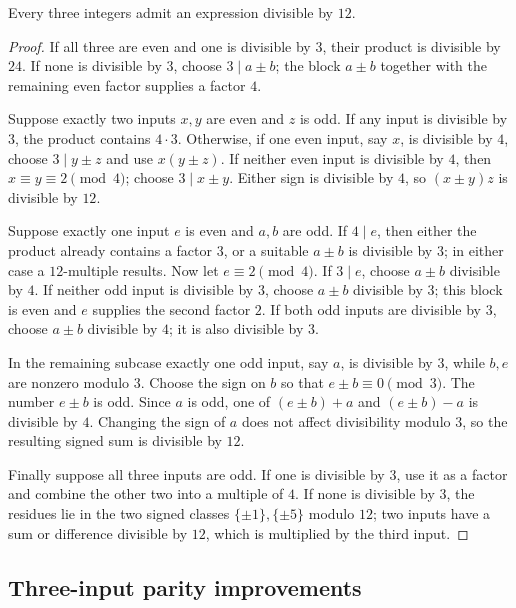 \begin{theorem}\label{app:three12}
Every three integers admit an expression divisible by $12$.
\end{theorem}
\begin{proof}
If all three are even and one is divisible by $3$, their product is divisible
by $24$.  If none is divisible by $3$, choose $3\mid a\pm b$; the block
$a\pm b$ together with the remaining even factor supplies a factor $4$.

Suppose exactly two inputs $x,y$ are even and $z$ is odd.  If any input is
divisible by $3$, the product contains $4\cdot3$.  Otherwise, if one even
input, say $x$, is divisible by $4$, choose $3\mid y\pm z$ and use
$x(y\pm z)$.  If neither even input is divisible by $4$, then
$x\equiv y\equiv2\pmod4$; choose $3\mid x\pm y$.  Either sign is divisible
by $4$, so $(x\pm y)z$ is divisible by $12$.

Suppose exactly one input $e$ is even and $a,b$ are odd.  If $4\mid e$, then
either the product already contains a factor $3$, or a suitable $a\pm b$ is
divisible by $3$; in either case a $12$-multiple results.  Now let
$e\equiv2\pmod4$.  If $3\mid e$, choose $a\pm b$ divisible by $4$.  If
neither odd input is divisible by $3$, choose $a\pm b$ divisible by $3$;
this block is even and $e$ supplies the second factor $2$.  If both odd
inputs are divisible by $3$, choose $a\pm b$ divisible by $4$; it is also
divisible by $3$.

In the remaining subcase exactly one odd input, say $a$, is divisible by
$3$, while $b,e$ are nonzero modulo $3$.  Choose the sign on $b$ so that
$e\pm b\equiv0\pmod3$.  The number $e\pm b$ is odd.  Since $a$ is odd, one
of $(e\pm b)+a$ and $(e\pm b)-a$ is divisible by $4$.  Changing the sign of
$a$ does not affect divisibility modulo $3$, so the resulting signed sum is
divisible by $12$.

Finally suppose all three inputs are odd.  If one is divisible by $3$, use it
as a factor and combine the other two into a multiple of $4$.  If none is
divisible by $3$, the residues lie in the two signed classes
$\{\pm1\},\{\pm5\}$ modulo $12$; two inputs have a sum or difference
divisible by $12$, which is multiplied by the third input.
\end{proof}

\subsection{Three-input parity improvements}

